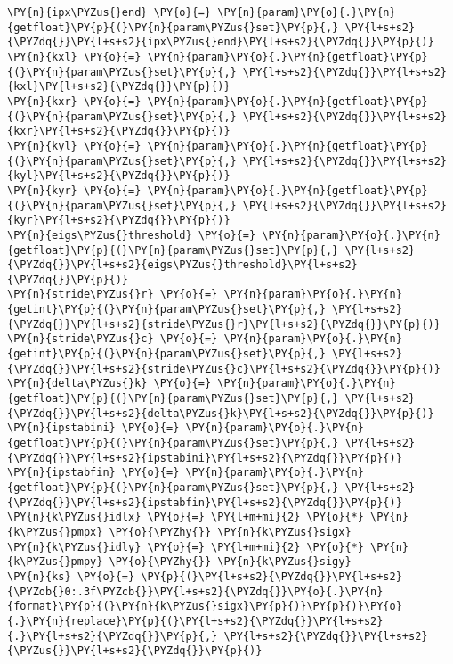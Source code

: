 \begin{Verbatim}[commandchars=\\\{\}]
\PY{n}{ipx\PYZus{}end} \PY{o}{=} \PY{n}{param}\PY{o}{.}\PY{n}{getfloat}\PY{p}{(}\PY{n}{param\PYZus{}set}\PY{p}{,} \PY{l+s+s2}{\PYZdq{}}\PY{l+s+s2}{ipx\PYZus{}end}\PY{l+s+s2}{\PYZdq{}}\PY{p}{)}
\PY{n}{kxl} \PY{o}{=} \PY{n}{param}\PY{o}{.}\PY{n}{getfloat}\PY{p}{(}\PY{n}{param\PYZus{}set}\PY{p}{,} \PY{l+s+s2}{\PYZdq{}}\PY{l+s+s2}{kxl}\PY{l+s+s2}{\PYZdq{}}\PY{p}{)}
\PY{n}{kxr} \PY{o}{=} \PY{n}{param}\PY{o}{.}\PY{n}{getfloat}\PY{p}{(}\PY{n}{param\PYZus{}set}\PY{p}{,} \PY{l+s+s2}{\PYZdq{}}\PY{l+s+s2}{kxr}\PY{l+s+s2}{\PYZdq{}}\PY{p}{)}
\PY{n}{kyl} \PY{o}{=} \PY{n}{param}\PY{o}{.}\PY{n}{getfloat}\PY{p}{(}\PY{n}{param\PYZus{}set}\PY{p}{,} \PY{l+s+s2}{\PYZdq{}}\PY{l+s+s2}{kyl}\PY{l+s+s2}{\PYZdq{}}\PY{p}{)}
\PY{n}{kyr} \PY{o}{=} \PY{n}{param}\PY{o}{.}\PY{n}{getfloat}\PY{p}{(}\PY{n}{param\PYZus{}set}\PY{p}{,} \PY{l+s+s2}{\PYZdq{}}\PY{l+s+s2}{kyr}\PY{l+s+s2}{\PYZdq{}}\PY{p}{)}
\PY{n}{eigs\PYZus{}threshold} \PY{o}{=} \PY{n}{param}\PY{o}{.}\PY{n}{getfloat}\PY{p}{(}\PY{n}{param\PYZus{}set}\PY{p}{,} \PY{l+s+s2}{\PYZdq{}}\PY{l+s+s2}{eigs\PYZus{}threshold}\PY{l+s+s2}{\PYZdq{}}\PY{p}{)}
\PY{n}{stride\PYZus{}r} \PY{o}{=} \PY{n}{param}\PY{o}{.}\PY{n}{getint}\PY{p}{(}\PY{n}{param\PYZus{}set}\PY{p}{,} \PY{l+s+s2}{\PYZdq{}}\PY{l+s+s2}{stride\PYZus{}r}\PY{l+s+s2}{\PYZdq{}}\PY{p}{)}
\PY{n}{stride\PYZus{}c} \PY{o}{=} \PY{n}{param}\PY{o}{.}\PY{n}{getint}\PY{p}{(}\PY{n}{param\PYZus{}set}\PY{p}{,} \PY{l+s+s2}{\PYZdq{}}\PY{l+s+s2}{stride\PYZus{}c}\PY{l+s+s2}{\PYZdq{}}\PY{p}{)}
\PY{n}{delta\PYZus{}k} \PY{o}{=} \PY{n}{param}\PY{o}{.}\PY{n}{getfloat}\PY{p}{(}\PY{n}{param\PYZus{}set}\PY{p}{,} \PY{l+s+s2}{\PYZdq{}}\PY{l+s+s2}{delta\PYZus{}k}\PY{l+s+s2}{\PYZdq{}}\PY{p}{)}
\PY{n}{ipstabini} \PY{o}{=} \PY{n}{param}\PY{o}{.}\PY{n}{getfloat}\PY{p}{(}\PY{n}{param\PYZus{}set}\PY{p}{,} \PY{l+s+s2}{\PYZdq{}}\PY{l+s+s2}{ipstabini}\PY{l+s+s2}{\PYZdq{}}\PY{p}{)}
\PY{n}{ipstabfin} \PY{o}{=} \PY{n}{param}\PY{o}{.}\PY{n}{getfloat}\PY{p}{(}\PY{n}{param\PYZus{}set}\PY{p}{,} \PY{l+s+s2}{\PYZdq{}}\PY{l+s+s2}{ipstabfin}\PY{l+s+s2}{\PYZdq{}}\PY{p}{)}
\PY{n}{k\PYZus{}idlx} \PY{o}{=} \PY{l+m+mi}{2} \PY{o}{*} \PY{n}{k\PYZus{}pmpx} \PY{o}{\PYZhy{}} \PY{n}{k\PYZus{}sigx}
\PY{n}{k\PYZus{}idly} \PY{o}{=} \PY{l+m+mi}{2} \PY{o}{*} \PY{n}{k\PYZus{}pmpy} \PY{o}{\PYZhy{}} \PY{n}{k\PYZus{}sigy}
\PY{n}{ks} \PY{o}{=} \PY{p}{(}\PY{l+s+s2}{\PYZdq{}}\PY{l+s+s2}{\PYZob{}0:.3f\PYZcb{}}\PY{l+s+s2}{\PYZdq{}}\PY{o}{.}\PY{n}{format}\PY{p}{(}\PY{n}{k\PYZus{}sigx}\PY{p}{)}\PY{p}{)}\PY{o}{.}\PY{n}{replace}\PY{p}{(}\PY{l+s+s2}{\PYZdq{}}\PY{l+s+s2}{.}\PY{l+s+s2}{\PYZdq{}}\PY{p}{,} \PY{l+s+s2}{\PYZdq{}}\PY{l+s+s2}{\PYZus{}}\PY{l+s+s2}{\PYZdq{}}\PY{p}{)}

\end{Verbatim}
